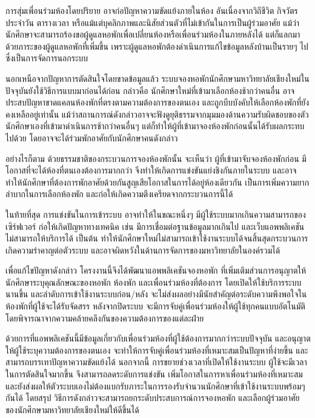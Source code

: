 การสุ่มเพื่อนร่วมห้องโดยปริยาย อาจก่อปัญหาความขัดแย้งภายในห้อง อันเนื่องจากวิถีชีวิต กิจวัตรประจำวัน ตารางเวลา หรือแม้แต่บุคลิกภาพและนิสัยส่วนตัวที่ไม่เข้ากันในการเป็นผู้ร่วมอาศัย
แม้ว่านักศึกษาจะสามารถร้องขอผู้ดูแลหอพักเพื่อเปลี่ยนห้องหรือเพื่อนร่วมห้องในภายหลังได้ แต่ก็แลกมาด้วยภาระของผู้ดูแลหอพักที่เพิ่มขึ้น เพราะผู้ดูแลหอพักต้องดำเนินการแก้ไขข้อมูลหลังบ้านเป็นรายๆ ไป ซึ่งเป็นการจัดการนอกระบบ

นอกเหนือจากปัญหาการตัดสินใจโดยขาดข้อมูลแล้ว ระบบจองหอพักนักศึกษามหาวิทยาลัยเชียงใหม่ในปัจจุบันยังใช้วิธีการแบบมาก่อนได้ก่อน กล่าวคือ นักศึกษาใหม่ที่เข้ามาเลือกห้องช้ากว่าคนอื่น อาจประสบปัญหาขาดแคลนห้องพักที่ตรงตามความต้องการของตนเอง และถูกบีบบังคับให้เลือกห้องพักที่ยังคงเหลืออยู่เท่านั้น
แม้ว่าสถานการณ์ดังกล่าวอาจจะฟังดูยุติธรรมจากมุมมองด้านความรับผิดชอบของตัวนักศึกษาเองที่เข้ามาดำเนินการช้ากว่าคนอื่นๆ แต่ก็ทำให้ผู้ที่เข้ามาจองห้องพักก่อนนั้นได้รับผลกระทบไปด้วย โดยอาจจะได้ร่วมพักอาศัยกับนักศึกษาคนดังกล่าว

อย่างไรก็ตาม ด้วยธรรมชาติของกระบวนการจองห้องพักนั้น จะเห็นว่า ผู้ที่เข้ามาจับจองห้องพักก่อน มีโอกาสที่จะได้ห้องที่ตนเองต้องการมากกว่า
จึงทำให้เกิดการแข่งขันแย่งชิงกันภายในระบบ
และอาจทำให้นักศึกษาที่ต้องการพักอาศัยด้วยกันสูญเสียโอกาสในการได้อยู่ห้องเดียวกัน เป็นการเพิ่มความยากลำบากในการเลือกห้องพัก และก่อให้เกิดความตึงเครียดจากกระบวนการนี้ได้

ในท้ายที่สุด การแข่งขันในการเข้าระบบ อาจทำให้ในขณะหนึ่งๆ มีผู้ใช้ระบบมากเกินความสามารถของเซิร์ฟเวอร์ ก่อให้เกิดปัญหาทางเทคนิค เช่น 
มีการเชื่อมต่อฐานข้อมูลมากเกินไป และเว็บแอพพลิเคชันไม่สามารถให้บริการได้ เป็นต้น ทำให้นักศึกษาใหม่ไม่สามารถเข้าใช้งานระบบได้จนสิ้นสุดกระบวนการ 
เกิดความรำคาญต่อตัวระบบ และอาจผิดหวังในด้านการจัดการของมหาวิทยาลัยในองค์รวมได้

เพื่อแก้ไขปัญหาดังกล่าว โครงงานนี้จึงได้พัฒนาแอพพลิเคชันจองหอพัก 
ที่เพิ่มเติมส่วนการอนุญาตให้นักศึกษาระบุคุณลักษณะของหอพัก ห้องพัก 
และเพื่อนร่วมห้องที่ต้องการ
โดยเปิดให้ใช้บริการระบบนานขึ้น และลำดับการเข้าใช้งานระบบก่อน/หลัง จะไม่ส่งผลอย่างมีนัยสำคัญต่อระดับความพึงพอใจในห้องพักที่ผู้ใช้จะได้รับจัดสรร
หลังจากปิดระบบ จะมีการจับคู่เพื่อนร่วมห้องให้ผู้ใช้ทุกคนแบบอัตโนมัติ 
โดยพิจารณาจากความคล้ายคลึงกันของความต้องการของแต่ละฝ่าย

ด้วยการที่แอพพลิเคชันนี้มีข้อมูลเกี่ยวกับเพื่อนร่วมห้องที่ผู้ใช้ต้องการมากกว่าระบบปัจจุบัน และอนุญาตให้ผู้ใช้ระบุความต้องการของตนเอง 
จะทำให้การจับคู่เพื่อนร่วมห้องที่เหมาะสมเป็นปัญหาที่ง่ายขึ้น และสามารถบรรเทาปัญหาความขัดแย้งได้ 
นอกจากนี้ การขยายช่วงเวลาที่เปิดให้ใช้งานระบบ ผู้ใช้จะมีเวลาในการตัดสินใจมากขึ้น 
จึงสามารถลดระดับการแข่งขัน เพิ่มโอกาสในการหาเพื่อนร่วมห้องที่เหมาะสม และยังส่งผลให้ตัวระบบเองไม่ต้องแบกรับภาระในการรองรับจำนวนนักศึกษาที่เข้าใช้งานระบบพร้อมๆ กันได้ 
โดยสรุป วิธีการดังกล่าวจะสามารถยกระดับประสบการณ์การจองหอพัก 
และเลือกผู้ร่วมอาศัยของนักศึกษามหาวิทยาลัยเชียงใหม่ให้ดีขึ้นได้

